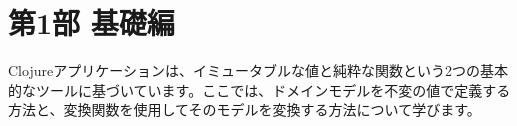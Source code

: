 \part{第1部 基礎編}

Clojureアプリケーションは、イミュータブルな値と純粋な関数という2つの基本的なツールに基づいています。ここでは、ドメインモデルを不変の値で定義する方法と、変換関数を使用してそのモデルを変換する方法について学びます。





